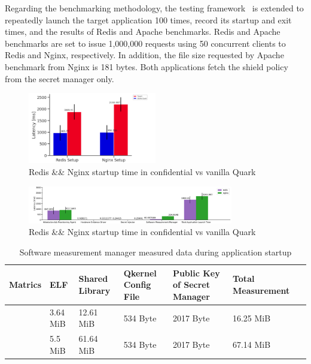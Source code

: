 Regarding the benchmarking methodology, the testing framework~\cite*{benchamark_framework} is extended to repeatedly launch the target application 100 times, record its startup and exit times, and the results of Redis and Apache benchmarks. Redis and Apache benchmarks are set to issue 1,000,000 
requests using 50 concurrent clients to Redis and Nginx, respectively. In addition, the file size requested by Apache benchmark from Nginx is 181 bytes. Both applications fetch the shield policy from the secret manager only.


 \begin{figure}[!htb]
  \centering
  \includegraphics[width=0.5\textwidth]{images/reds_nginx_startup_comp.PNG}
  \caption[Redis \&\& Nginx startup time in confidential vs vanilla Quark]{Redis \&\& Nginx startup time in confidential vs vanilla Quark}
  \label{fig:reds_nginx_startup_comp}
\end{figure}


\begin{figure}[!htb]
  \centering
  \includegraphics[width=0.8\textwidth]{images/time_disribution_startup_redis_nginx.PNG}
  \caption[Redis \&\& Nginx startup time in confidential vs vanilla Quark]{Redis \&\& Nginx startup time in confidential vs vanilla Quark}
  \label{fig:time_disribution_startup_redis_nginx}
\end{figure}



\begin{table}[!htb]
  \centering
  \scriptsize

  \begin{tabularx}{1\textwidth}{@{} l L L L L L L@{}}
  \toprule
      Matrics    & ELF &  Shared Library   &Qkernel Config File    & Public Key of Secret Manager  & Total Measurement\\
  \midrule

           &  3.64 MiB   &   12.61 MiB  &   534 Byte      &2017 Byte   & 16.25 MiB\\
           &  5.5 MiB    &   61.64 MiB  &   534 Byte      &2017 Byte   & 67.14 MiB\\
  \bottomrule
  \end{tabularx}
  \caption{Software measurement manager measured data during application startup}
  \label{table:Measurement_For_Nginx_Redis}
\end{table}

